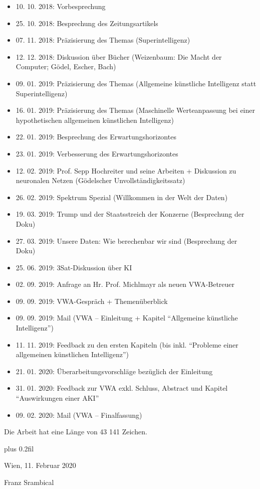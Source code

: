 \documentclass[DLS,
	inreferencehack,
	ohneVgl=false,
	ohneS=false,
	scauthor,
	rundeauslassung=false,
	bookstyle=false,
	widowlines=3,
	titlepage=DLS2017,
	listof=nochaptergap,
	doppelpunkt=false,
	postnotedoppelpunkt=false,
	zitierstil=klassisch]{vwa}
\begin{document}
\begin{itemize}
  \item 10. 10. 2018: Vorbesprechung
  \item 25. 10. 2018: Besprechung des Zeitungsartikels
  \item 07. 11. 2018: Präzisierung des Themas (Superintelligenz)
  \item 12. 12. 2018: Diskussion über Bücher (Weizenbaum: Die Macht der Computer; Gödel, Escher, Bach)
  \item 09. 01. 2019: Präzisierung des Themas (Allgemeine künstliche Intelligenz statt Superintelligenz)
  \item 16. 01. 2019: Präzisierung des Themas (Maschinelle Werteanpassung bei einer hypothetischen allgemeinen künstlichen Intelligenz)
  \item 22. 01. 2019: Besprechung des Erwartungshorizontes
  \item 23. 01. 2019: Verbesserung des Erwartungshorizontes
  \item 12. 02. 2019: Prof. Sepp Hochreiter und seine Arbeiten + Diskussion zu neuronalen Netzen (Gödelscher Unvollständigkeitssatz)
  \item 26. 02. 2019: Spektrum Spezial (Willkommen in der Welt der Daten)
  \item 19. 03. 2019: Trump und der Staatsstreich der Konzerne (Besprechung der Doku)
  \item 27. 03. 2019: Unsere Daten: Wie berechenbar wir sind (Besprechung der Doku)
  \item 25. 06. 2019: 3Sat-Diskussion über KI
  \item 02. 09. 2019: Anfrage an Hr. Prof. Michlmayr als neuen VWA-Betreuer
  \item 09. 09. 2019: VWA-Gespräch + Themenüberblick
  \item 09. 09. 2019: Mail (VWA -- Einleitung + Kapitel \enquote{Allgemeine künstliche Intelligenz})
  \item 11. 11. 2019: Feedback zu den ersten Kapiteln (bis inkl. \enquote{Probleme einer allgemeinen künstlichen Intelligenz})
  \item 21. 01. 2020: Überarbeitungsvorschläge bezüglich der Einleitung
  \item 31. 01. 2020: Feedback zur VWA exkl. Schluss, Abstract und Kapitel \enquote{Auswirkungen einer AKI}
  \item 09. 02. 2020: Mail (VWA -- Finalfassung)
\end{itemize}
{\centering\vrule height 0.025pt depth 0.025pt width 6em\par}


Die Arbeit hat eine Länge von 43 141 Zeichen.



{\centering\setlength\baselineskip{.5\baselineskip}\vrule height 0.025pt depth 0.025pt width 6em\par} \vskip3cm plus 0.2fil

Wien, 11. Februar 2020\par \vskip2cm {\raggedleft Franz Srambical\par}


\end{document}
